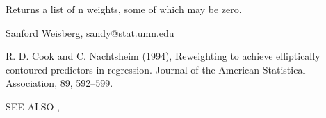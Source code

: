 \begin{Value}
Returns a list of n weights, some of which may be zero.\end{Value}
\begin{Author}\relax
Sanford Weisberg, sandy@stat.umn.edu\end{Author}
\begin{References}\relax
R. D. Cook and C. Nachtsheim (1994), Reweighting to achieve
elliptically contoured predictors in regression.  Journal of the American
Statistical Association, 89, 592--599.\end{References}
\begin{SeeAlso}\relax
SEE ALSO ,\end{SeeAlso}


